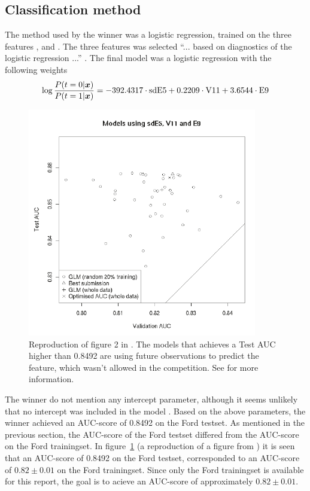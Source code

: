 \subsection{Classification method}
The method used by the winner was a logistic regression, trained on the three features ,  and . The three features was selected ``... based on diagnostics of the logistic regression ...'' \citep[p.3]{inference_winning_approach}. The final model was a logistic regression with the following weights
\[
    \log\frac{P(t=0|\boldsymbol{x})}{P(t=1|\boldsymbol{x})} = -392.4317\cdot\text{sdE5} + 0.2209\cdot\text{V11} + 3.6544\cdot\text{E9}
\]
\begin{figure}
    \centering
    \includegraphics[width=100mm]{media/fig2-inference-paper.pdf}
    \caption{Reproduction of figure 2 in \citet{inference_winning_approach}. The models that achieves a Test AUC higher than 0.8492 are using future observations to predict the  feature, which wasn't allowed in the competition. See \citet{inference_winning_approach} for more information.}\label{fig:auc-score-inference-paper}
\end{figure}
The winner do not mention any intercept parameter, although it seems unlikely that no intercept was included in the model \citep{meetings-morten}. Based on the above parameters, the winner achieved an AUC-score of 0.8492 on the Ford testset. As mentioned in the previous section, the AUC-score of the Ford testset differed from the AUC-score on the Ford trainingset. In figure~\ref{fig:auc-score-inference-paper} (a reproduction of a figure from \citet{inference_winning_approach}) it is seen that an AUC-score of 0.8492 on the Ford testset, corresponded to an AUC-score of $0.82\pm0.01$ on the Ford trainingset. Since only the Ford trainingset is available for this report, the goal is to acieve an AUC-score of approximately $0.82\pm0.01$.

